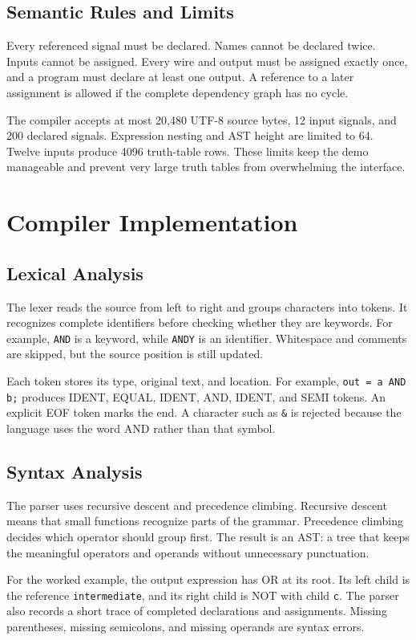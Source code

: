 \documentclass[conference]{IEEEtran}
\newcommand{\code}[1]{\texttt{#1}}
\begin{document}
\subsection{Semantic Rules and Limits}
Every referenced signal must be declared. Names cannot be declared twice. Inputs cannot be assigned. Every wire and output must be assigned exactly once, and a program must declare at least one output. A reference to a later assignment is allowed if the complete dependency graph has no cycle.

The compiler accepts at most 20,480 UTF-8 source bytes, 12 input signals, and 200 declared signals. Expression nesting and AST height are limited to 64. Twelve inputs produce 4096 truth-table rows. These limits keep the demo manageable and prevent very large truth tables from overwhelming the interface.

\section{Compiler Implementation}
\subsection{Lexical Analysis}
The lexer reads the source from left to right and groups characters into tokens. It recognizes complete identifiers before checking whether they are keywords. For example, \code{AND} is a keyword, while \code{ANDY} is an identifier. Whitespace and comments are skipped, but the source position is still updated.

Each token stores its type, original text, and location. For example, \code{out = a AND b;} produces IDENT, EQUAL, IDENT, AND, IDENT, and SEMI tokens. An explicit EOF token marks the end. A character such as \code{\&} is rejected because the language uses the word AND rather than that symbol.

\subsection{Syntax Analysis}
The parser uses recursive descent and precedence climbing. Recursive descent means that small functions recognize parts of the grammar. Precedence climbing decides which operator should group first. The result is an AST: a tree that keeps the meaningful operators and operands without unnecessary punctuation.

For the worked example, the output expression has OR at its root. Its left child is the reference \code{intermediate}, and its right child is NOT with child \code{c}. The parser also records a short trace of completed declarations and assignments. Missing parentheses, missing semicolons, and missing operands are syntax errors.
\end{document}
